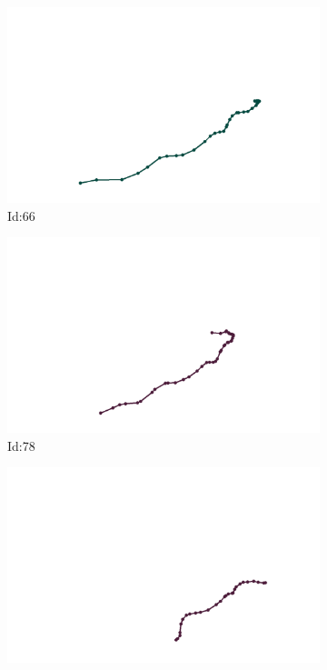 \documentclass[12pt,twoside]{report}
\begin{document}
\begin{figure}
\centering
\begin{subfigure}[b]{0.20\textwidth}
\centering
\includegraphics[width=\textwidth]{../../trajectories/66.png}
\caption{Id:66}
\end{subfigure}
\begin{subfigure}[b]{0.20\textwidth}
\centering
\includegraphics[width=\textwidth]{../../trajectories/78.png}
\caption{Id:78}
\end{subfigure}
\begin{subfigure}[b]{0.20\textwidth}
\centering
\includegraphics[width=\textwidth]{../../trajectories/211.png}

\end{subfigure}
\end{figure}
\end{document}
